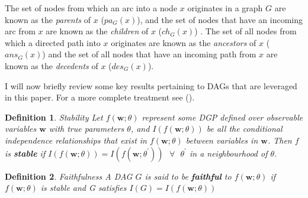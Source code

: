 \documentclass{article}
\newtheorem{definition}{Definition}
\begin{document}
The set of nodes from which an arc into a node $x$ originates in a graph $G$ are known as the \textit{parents} of $x$ ($pa_G(x)$), and the set of nodes that have an incoming arc from $x$ are known as the \textit{children} of $x$ ($ch_G(x)$) \parencite{pearl2009causality}. The set of all nodes from which a directed path into $x$ originates are known as the \textit{ancestors} of $x$ ($ans_G(x)$) and the set of all nodes that have an incoming path from $x$ are known as the \textit{decedents} of $x$ ($des_G(x)$). 

I will now briefly review some key results pertaining to DAGs that are leveraged in this paper. For a more complete treatment see \citeauthor{pearl2009causality} (\citeyear{pearl2009causality}).

\theoremstyle{definition}
\begin{definition}{Stability}
  Let $f(\mathbf{w};\theta)$ represent some DGP defined over observable variables $\mathbf{w}$ with true parameters $\theta$, and $I(f(\mathbf{w};\theta))$ be all the conditional independence relationships that exist in $f(\mathbf{w};\theta)$ between variables in $\mathbf{w}$. Then $f$ is \textbf{stable} if $I(f(\mathbf{w};\theta)) = I(f(\mathbf{w};\theta^\prime)) \text{  } \forall \text{  } \theta^\prime$ in a neighbourhood of $\theta$. \parencite[p.48]{pearl2009causality}
  \label{stability}
\end{definition}

\begin{definition}{Faithfulness}
   A DAG $G$ is said to be \textbf{faithful} to $f(\mathbf{w};\theta)$ if $f(\mathbf{w};\theta)$ is stable and G satisfies $I(G) = I(f(\mathbf{w};\theta))$ 
  \parencite[p.31]{spirtes2000causation}
  \label{faithfulness}
\end{definition}
\end{document}
